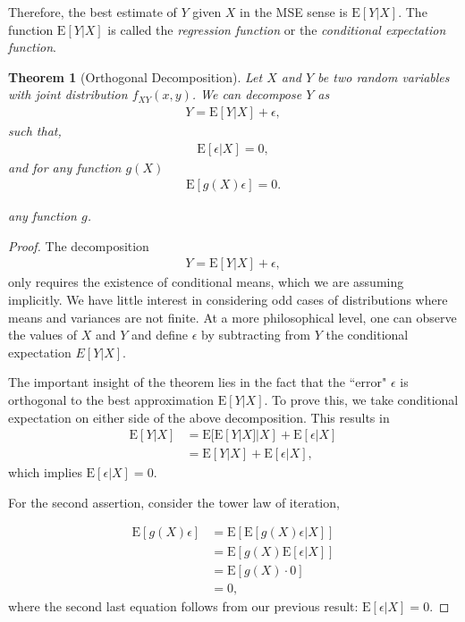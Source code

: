 \documentclass{amsart}
\newtheorem{theorem}{Theorem}
\theoremstyle{plain}
\numberwithin{equation}{section}
\begin{document}
Therefore, the best estimate 
of $Y$ given $X$ in the MSE sense 
is $\mathrm{E}[Y|X]$. The function
$\mathrm{E}[Y|X]$ is called the 
\emph{regression function} or the 
\emph{conditional expectation function}.

\begin{theorem}[Orthogonal Decomposition]
Let $X$ and $Y$ be two random variables with
joint distribution $f_{XY}(x, y)$. We can decompose
$Y$ as
\begin{align*}
Y = \mathrm{E}[Y|X] + \epsilon,
\end{align*}
such that,
\begin{align*}
\mathrm{E}[\epsilon|X] = 0,
\end{align*} 
and for any function $g(X)$
\begin{align*}
\mathrm{E}[g(X)\epsilon] = 0.
\end{align*}

any function $g$. 
\end{theorem}

\begin{proof}
The decomposition
\begin{align*}
Y = \mathrm{E}[Y|X] + \epsilon,
\end{align*}
only requires the existence of conditional means, which we
are assuming implicitly. We have little interest in considering odd cases of 
distributions where means and variances are not finite. 
At a more philosophical level, one can observe the values of $X$ and $Y$
and define $\epsilon$ by subtracting from $Y$ the conditional 
expectation ${E}[Y|X]$.

The important insight of the theorem lies in the fact that the 
``error" $\epsilon$ is 
orthogonal to the best approximation $\mathrm{E}[Y|X]$. To prove
this, we take conditional expectation on either side of the above 
decomposition. This results in
\begin{align*}
\mathrm{E}[Y|X] &= \mathrm{E}[\mathrm{E}[Y|X]|X]  + \mathrm{E}[\epsilon|X]\\
&= \mathrm{E}[Y|X]  + \mathrm{E}[\epsilon|X],
\end{align*}
which implies $\mathrm{E}[\epsilon|X] = 0$.

For the second assertion, consider the tower law of iteration,

\begin{align*}
\mathrm{E}[g(X)\epsilon] &= \mathrm{E}[\mathrm{E}[g(X)\epsilon|X]]\\
&= \mathrm{E}[g(X)\mathrm{E}[\epsilon|X]]\\
&= \mathrm{E}[g(X) \cdot 0]\\
&= 0,
\end{align*}
where the second last equation follows from our previous result:
$\mathrm{E}[\epsilon|X] = 0$.
\end{proof}
\end{document}
